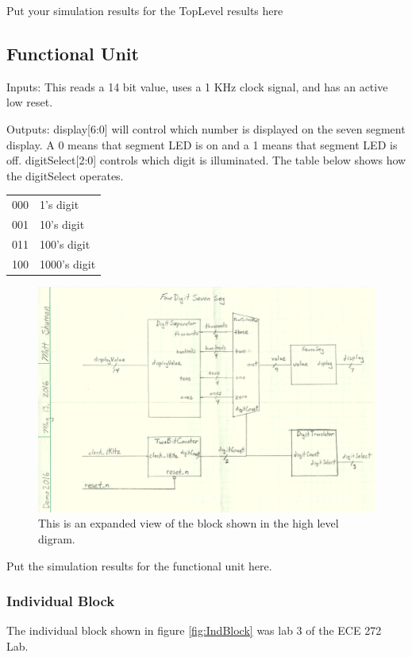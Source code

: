 \documentclass[a4paper]{article}
\begin{document}
\vspace{.25 in}

Put your simulation results for the TopLevel results here

\subsection{Functional Unit}
Inputs:  This reads a 14 bit value, uses a 1 KHz clock signal, and has an active low reset.\newline


Outputs:  display[6:0] will control which number is displayed on the seven segment display.  A 0 means that segment LED is on and a 1 means that segment LED is off.  digitSelect[2:0] controls which digit is illuminated.  The table below shows how the digitSelect operates.


\begin{center}
  \begin{tabular}{ c | l }
  \hline			
  000 & 1's digit \\
  001 & 10's digit \\
  011 & 100's digit \\
  100 & 1000's digit \\
  \hline  
  \end{tabular}
\end{center}

\begin{figure}[h]
  \centering
    \includegraphics[width=.5\textwidth]{Images/FunctionalUnit.png}
	\caption{This is an expanded view of the block shown in the high level digram.}
    \label{fig:FourDigSevenSegment}
\end{figure}

\vspace{.25 in}
Put the simulation results for the functional unit here.

\subsubsection{Individual Block}
The individual block shown in figure \ref{fig:IndBlock} was lab 3 of the ECE 272 Lab.
\end{document}
